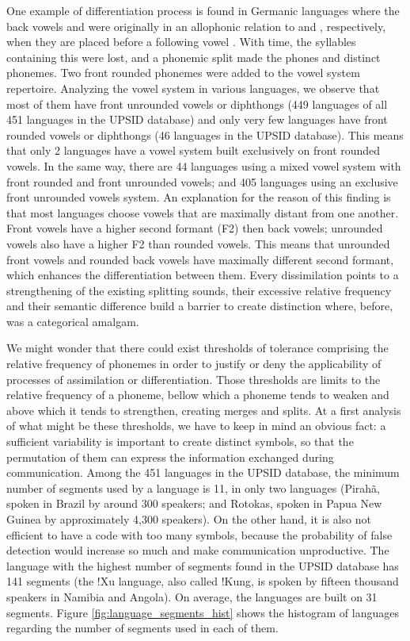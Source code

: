 One example of differentiation process is found in Germanic languages where the back vowels \textipa{[u]} and \textipa{[o]} were originally in an allophonic relation to \textipa{[y]} and \textipa{[\o]}, respectively, when they are placed before a following vowel . With time, the syllables containing this  were lost, and a phonemic split made the phones  and \textipa{/\o/} distinct phonemes. Two front rounded phonemes were added to the vowel system repertoire. Analyzing the vowel system in various languages, we observe that most of them have front unrounded vowels or diphthongs (449 languages of all 451 languages in the UPSID database) and only very few languages have front rounded vowels or diphthongs (46 languages in the UPSID database). This means that only 2 languages have a vowel system built exclusively on front rounded vowels. In the same way, there are 44 languages using a mixed vowel system with front rounded and front unrounded vowels; and 405 languages using an exclusive front unrounded vowels system. An explanation for the reason of this finding is that most languages choose vowels that are maximally distant from one another. Front vowels have a higher second formant (F2) then back vowels; unrounded vowels also have a higher F2 than rounded vowels. This means that unrounded front vowels and rounded back vowels have maximally different second formant, which enhances the differentiation between them. Every dissimilation points to a strengthening of the existing splitting sounds, their excessive relative frequency and their semantic difference build a barrier to create distinction where, before, was a categorical amalgam.

We might wonder that there could exist thresholds of tolerance comprising the relative frequency of phonemes in order to justify or deny the applicability of processes of assimilation or differentiation. Those thresholds are limits to the relative frequency of a phoneme, bellow which a phoneme tends to weaken and above which it tends to strengthen, creating merges and splits. At a first analysis of what might be these thresholds, we have to keep in mind an obvious fact: a sufficient variability is important to create distinct symbols, so that the permutation of them can express the information exchanged during communication. Among the 451 languages in the UPSID database, the minimum number of segments used by a language is 11, in only two languages (Pirah\~a, spoken in Brazil by around 300 speakers; and Rotokas, spoken in Papua New Guinea by approximately 4,300 speakers). On the other hand, it is also not efficient to have a code with too many symbols, because the probability of false detection would increase so much and make communication unproductive. The language with the highest number of segments found in the UPSID database has 141 segments (the !Xu language, also called !Kung, is spoken by fifteen thousand speakers in Namibia and Angola). On average, the languages are built on 
31 %
segments. Figure \ref{fig:language_segments_hist} shows the histogram of languages regarding the number of segments used in each of them.

